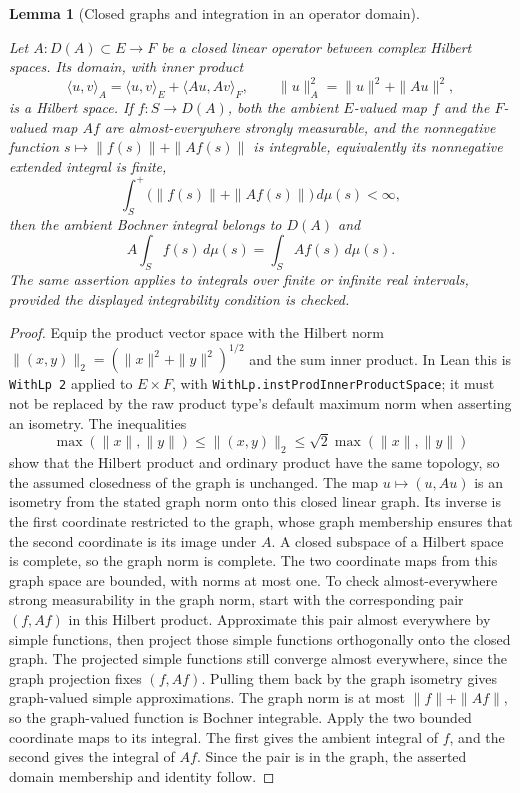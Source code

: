 \documentclass[11pt,a4paper]{article}
\newtheorem{lemma}[theorem]{Lemma}
\theoremstyle{definition}
\theoremstyle{remark}
\newcommand{\proofid}[1]{\par\smallskip{\normalfont\scriptsize\color{inkblue}Stable ID: \nolinkurl{#1}}\par\smallskip}
\begin{document}
\begin{lemma}[Closed graphs and integration in an operator domain]
\label{basic:graph-integration}
\proofid{basic:graph-integration}
\par{}\par\smallskip

Let $A:D(A)\subset E\to F$ be a closed linear operator between complex
Hilbert spaces. Its domain, with inner product
\[
 \langle u,v\rangle_A=\langle u,v\rangle_E+\langle Au,Av\rangle_F,
 \qquad \|u\|_A^2=\|u\|^2+\|Au\|^2,
\]
is a Hilbert space. If $f:S\to D(A)$, both the ambient $E$-valued
map $f$ and the $F$-valued map $Af$ are almost-everywhere strongly measurable, and the
nonnegative function $s\mapsto\|f(s)\|+\|Af(s)\|$ is integrable,
equivalently its nonnegative extended integral is finite,
\[
 \int_S^{\!+}\bigl(\|f(s)\|+\|Af(s)\|\bigr)\,d\mu(s)<\infty,
\]
then the ambient Bochner integral belongs to $D(A)$ and
\[
 A\int_S f(s)\,d\mu(s)=\int_S Af(s)\,d\mu(s).
\]
The same assertion applies to integrals over finite or infinite real
intervals, provided the displayed integrability condition is checked.
\end{lemma}
\begin{proof}
Equip the product vector space with the Hilbert norm
$\|(x,y)\|_2=(\|x\|^2+\|y\|^2)^{1/2}$ and the sum inner product.
In Lean this is \texttt{WithLp 2} applied to $E\times F$, with
\nolinkurl{WithLp.instProdInnerProductSpace}; it must not be replaced
by the raw product type's default maximum norm when asserting an
isometry. The inequalities
\[
 \max(\|x\|,\|y\|)\leq\|(x,y)\|_2
 \leq\sqrt2\max(\|x\|,\|y\|)
\]
show that the Hilbert product and ordinary product have the same
topology, so the assumed closedness of the graph is unchanged.
The map $u\mapsto(u,Au)$ is an isometry from the stated graph norm
onto this closed linear graph. Its inverse is the first coordinate
restricted to the graph, whose graph membership ensures that the
second coordinate is its image under $A$. A closed subspace of a
Hilbert space is complete, so the graph norm is complete. The two coordinate maps from this graph space
are bounded, with norms at most one. To check almost-everywhere strong
measurability in the graph norm, start with the corresponding pair $(f,Af)$ in
this Hilbert product. Approximate this pair almost everywhere by simple
functions, then project those simple functions orthogonally onto the
closed graph. The projected simple functions still converge almost
everywhere, since the graph projection fixes $(f,Af)$. Pulling them
back by the graph isometry gives graph-valued simple approximations.
The graph norm is at most $\|f\|+\|Af\|$, so the graph-valued function
is Bochner integrable. Apply the two bounded coordinate maps to its
integral. The first gives the ambient integral of $f$, and the second
gives the integral of $Af$. Since the pair is in the graph, the asserted
domain membership and identity follow.
\end{proof}
\end{document}
